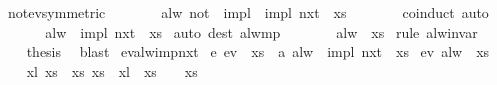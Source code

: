 \begin{isabellebody}
\ not{\isacharunderscore}ev{\isacharbrackleft}symmetric{\isacharbrackright}\ \isacommand{{\isachardot}}\isamarkupfalse%
\isanewline
\ \ \ \isamarkupfalse%
\ \isamarkupfalse%
\ {\isachardoublequoteopen}alw\ {\isacharparenleft}not\ {\isasympsi}\ impl\ {\isacharparenleft}{\isasymphi}\ impl\ nxt\ {\isasymphi}{\isacharparenright}{\isacharparenright}\ xs{\isachardoublequoteclose}\isanewline
\ \ \ \isamarkupfalse%
\ {}\ \isamarkupfalse%
\ coinduct\ auto\isanewline
\ \ \ \isamarkupfalse%
\ \isamarkupfalse%
\ {\isachardoublequoteopen}alw\ {\isacharparenleft}{\isasymphi}\ impl\ nxt\ {\isasymphi}{\isacharparenright}\ xs{\isachardoublequoteclose}\ \isamarkupfalse%
{\isacharparenleft}auto\ dest{\isacharcolon}\ alw{\isacharunderscore}mp{\isacharparenright}\isanewline
\ \ \ \isamarkupfalse%
\ {}\ \isamarkupfalse%
\ {\isachardoublequoteopen}alw\ {\isasymphi}\ xs{\isachardoublequoteclose}\ \isamarkupfalse%
{\isacharparenleft}rule\ alw{\isacharunderscore}invar{\isacharparenright}\isanewline
\ \ \isacommand{{\isacharbraceright}}\isamarkupfalse%
\isanewline
\ \ \isamarkupfalse%
\ {\isacharquery}thesis\ \isamarkupfalse%
\ blast\isanewline
{}\isamarkupfalse%
%
\endisatagproof
{\isafoldproof}%
%
\isadelimproof
\isanewline
%
\endisadelimproof
\isanewline
{}\isamarkupfalse%
\ ev{\isacharunderscore}alw{\isacharunderscore}imp{\isacharunderscore}nxt{\isacharcolon}\isanewline
{}\ e{\isacharcolon}\ {\isachardoublequoteopen}ev\ {\isasymphi}\ xs{\isachardoublequoteclose}\ \ a{\isacharcolon}\ {\isachardoublequoteopen}alw\ {\isacharparenleft}{\isasymphi}\ impl\ {\isacharparenleft}nxt\ {\isasymphi}{\isacharparenright}{\isacharparenright}\ xs{\isachardoublequoteclose}\isanewline
{}\ {\isachardoublequoteopen}ev\ {\isacharparenleft}alw\ {\isasymphi}{\isacharparenright}\ xs{\isachardoublequoteclose}\isanewline
%
\isadelimproof
%
\endisadelimproof
%
\isatagproof
{}\isamarkupfalse%
{\isacharminus}\isanewline
\ \ \isamarkupfalse%
\ xl\ xs{}\ \ xs{\isacharcolon}\ {\isachardoublequoteopen}xs\ {\isacharequal}\ xl\ {\isacharat}{\isacharminus}\ xs{}{\isachardoublequoteclose}\ \ {\isasymphi}{\isacharcolon}\ {\isachardoublequoteopen}{\isasymphi}\ xs{}{\isachardoublequoteclose}\isanewline
\ \ \isamarkupfalse%

\end{isabellebody}
